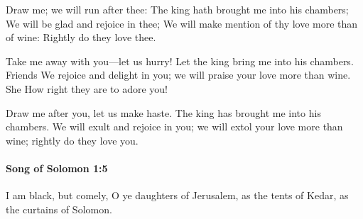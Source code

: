 			\begin{versebox}
					\item[BHS] 
					\item[LXX] 
					\item[ASV] Draw me; we will run after thee: The king hath brought me into his chambers; We will be glad and rejoice in thee; We will make mention of thy love more than of wine: Rightly do they love thee.
					\item[NIV] Take me away with you—let us hurry! Let the king bring me into his chambers. Friends We rejoice and delight in you; we will praise your love more than wine. She How right they are to adore you!
					\item[NRSV] Draw me after you, let us make haste. The king has brought me into his chambers. We will exult and rejoice in you; we will extol your love more than wine; rightly do they love you.
			\end{versebox}

		\paragraph{Song of Solomon 1:5} %
			\label{SONGOFSOLOMON-1-5}

			I am black, but comely, O ye daughters of Jerusalem, as the tents of Kedar, as the curtains of Solomon.

